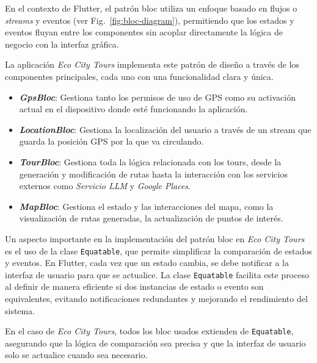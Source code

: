 En el contexto de Flutter, el patrón \acrlong{bloc} utiliza un enfoque basado en flujos o \textit{streams} y eventos (ver Fig.~\ref{fig:bloc-diagram}), permitiendo que los estados y eventos fluyan entre los componentes sin acoplar directamente la lógica de negocio con la interfaz gráfica. 

La aplicación \textit{Eco City Tours} implementa este patrón de diseño a través de los componentes principales, cada uno con una funcionalidad clara y única.
\begin{itemize}
	\item \textbf{\textit{GpsBloc}}: Gestiona tanto los permisos de uso de GPS como su activación actual en el dispositivo donde esté funcionando la aplicación.
	\item \textbf{\textit{LocationBloc}}: Gestiona la localización del usuario a través de un stream que guarda la posición GPS por la que va circulando.
	\item \textbf{\textit{TourBloc}}: Gestiona toda la lógica relacionada con los tours, desde la generación y modificación de rutas hasta la interacción con los servicios externos como \textit{Servicio LLM} y \textit{Google Places}.
	\item \textbf{\textit{MapBloc}}: Gestiona el estado y las interacciones del mapa, como la visualización de rutas generadas, la actualización de puntos de interés.
\end{itemize}

Un aspecto importante en la implementación del patrón \acrshort{bloc} en \textit{Eco City Tours} es el uso de la clase \texttt{Equatable}, que permite simplificar la comparación de estados y eventos. En Flutter, cada vez que un estado cambia, se debe notificar a la interfaz de usuario para que se actualice. La clase \texttt{Equatable} facilita este proceso al definir de manera eficiente si dos instancias de estado o evento son equivalentes, evitando notificaciones redundantes y mejorando el rendimiento del sistema.

En el caso de \textit{Eco City Tours}, todos los \acrshort{bloc} usados extienden de \texttt{Equatable}, asegurando que la lógica de comparación sea precisa y que la interfaz de usuario solo se actualice cuando sea necesario. 

